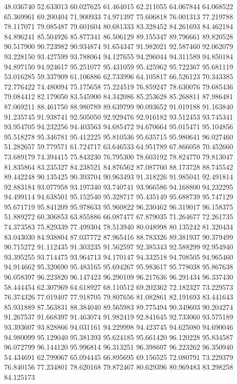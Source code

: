48.036740
52.633013
60.027625
61.464015
62.211055
64.067844
64.068522
65.369961
69.200404
71.900933
74.971397
75.606818
76.001313
77.219788
78.117071
79.085487
79.601604
80.681333
83.328452
84.261693
84.462184
84.896241
85.504926
85.877341
86.506129
89.155347
89.796661
89.820528
90.517900
90.723982
90.934874
91.654347
91.982021
92.587460
92.062079
93.228150
93.427599
93.788064
94.127655
94.296044
94.311589
94.850184
94.897150
94.924617
95.251077
95.431059
95.425962
95.722367
95.681119
53.016285
59.337909
61.106886
62.733996
64.105817
66.526123
70.343385
72.776422
74.480094
75.175658
75.224519
76.859247
78.630076
79.685436
79.084412
82.179050
83.545900
84.342086
85.253628
85.268811
87.986481
87.069211
88.461750
88.980789
89.639799
90.093652
91.019188
91.163840
91.235745
91.938741
92.505050
92.929476
92.916182
93.512453
93.745341
93.954705
94.232256
94.403563
94.685472
94.670664
95.015471
95.104856
95.518278
95.346781
95.412225
95.810536
95.635715
95.980641
96.027460
51.282657
59.779571
61.724717
63.646533
64.951789
67.866058
70.452660
73.689179
74.394415
75.843230
76.795300
78.603192
78.824770
79.813047
81.835864
83.235327
84.238521
84.876562
87.087760
88.173728
88.745542
89.442248
90.135425
90.393704
90.963493
91.318226
91.985041
92.491814
92.883184
93.077958
93.197340
93.740741
93.966586
94.168800
94.232295
94.499114
94.638501
95.152540
95.328717
95.435149
95.688739
95.747129
95.671719
95.841209
95.978633
95.960822
96.230462
96.319017
96.158375
51.889272
60.306853
63.855886
66.087477
67.879035
71.264677
72.261735
74.373583
75.829339
77.499304
78.513940
80.048998
80.135242
81.320434
83.043030
84.938804
87.037772
87.965416
88.783326
89.381937
90.379499
90.715272
91.112435
91.303235
91.562597
92.385343
92.588299
92.954940
93.395255
93.714475
93.964713
94.170147
94.332518
94.708505
94.965460
94.914662
95.320690
95.483165
95.694267
95.983617
95.778038
95.867638
96.058397
96.223820
96.147423
96.290109
96.217636
96.291434
96.337430
58.444454
62.307969
64.618927
68.110512
69.202362
72.182327
73.229573
76.374326
77.019407
77.918705
79.807656
81.082861
82.191693
83.441643
85.931889
87.563831
88.384040
89.565983
89.775494
90.349603
90.204274
91.267537
91.668397
91.463074
91.982419
92.841645
92.733060
93.575189
93.393607
93.828866
94.031161
94.229998
94.423745
94.625080
94.690046
94.980099
95.129040
95.381393
95.624185
95.661420
96.120228
95.834587
96.072799
96.144120
95.996814
96.313251
96.398607
96.223262
96.350940
54.434691
62.799067
65.094445
66.895695
69.156525
72.080791
73.229379
76.840156
77.234801
78.620168
79.872467
80.629396
80.969483
83.298258
84.125173
